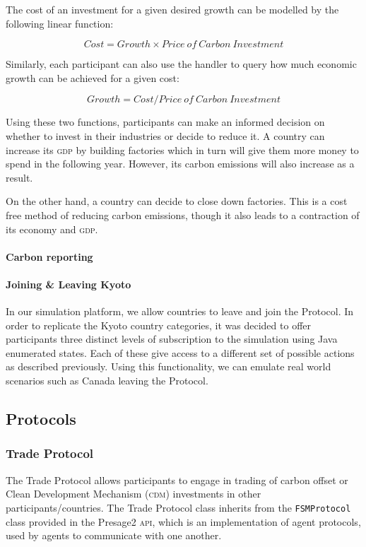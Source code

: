The cost of an investment for a given desired growth can be modelled by the following linear function:

$$
Cost = Growth \times Price~of~Carbon~Investment
$$

Similarly, each participant can also use the handler to query how much economic growth can be achieved for a given cost:

$$
Growth = Cost / Price~of~Carbon~Investment
$$

Using these two functions, participants can make an informed decision on whether to invest in their industries or decide to reduce it. A country can increase its \textsc{gdp} by building factories which in turn will give them more money to spend in the following year. However, its carbon emissions will also increase as a result.

On the other hand, a country can decide to close down factories. This is a cost free method of reducing carbon emissions, though it also leads to a contraction of its economy and \textsc{gdp}. 

\paragraph{Carbon reporting}

%
%

\paragraph{Joining \& Leaving Kyoto}

In our simulation platform, we allow countries to leave and join the Protocol. In order to replicate the Kyoto country categories, it was decided to offer participants three distinct levels of subscription to the simulation using Java enumerated states. Each of these give access to a different set of possible actions as described previously. Using this functionality, we can emulate real world scenarios such as Canada leaving the Protocol.

\subsection{Protocols}

\subsubsection{Trade Protocol}

The Trade Protocol allows participants to engage in trading of carbon offset or Clean Development Mechanism (\textsc{cdm}) investments in other participants/countries. The Trade Protocol class inherits from the \texttt{FSMProtocol} class provided in the Presage2 \textsc{api}, which is an implementation of agent protocols, used by agents to communicate with one another.
 
